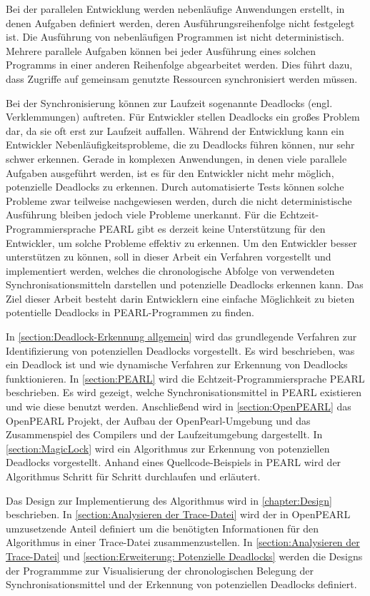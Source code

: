Bei der parallelen Entwicklung werden nebenläufige Anwendungen erstellt, in
denen Aufgaben definiert werden, deren Ausführungsreihenfolge nicht festgelegt
ist. Die Ausführung von nebenläufigen Programmen ist nicht deterministisch.
Mehrere parallele Aufgaben können bei jeder Ausführung eines solchen Programms
in einer anderen Reihenfolge abgearbeitet werden. Dies führt dazu, dass Zugriffe
auf gemeinsam genutzte Ressourcen synchronisiert werden müssen.

Bei der Synchronisierung können zur Laufzeit sogenannte Deadlocks (engl.
Verklemmungen) auftreten. Für Entwickler stellen Deadlocks ein großes Problem
dar, da sie oft erst zur Laufzeit auffallen. Während der Entwicklung kann ein
Entwickler Nebenläufigkeitsprobleme, die zu Deadlocks führen können, nur sehr
schwer erkennen. Gerade in komplexen Anwendungen, in denen viele parallele
Aufgaben ausgeführt werden, ist es für den Entwickler nicht mehr möglich,
potenzielle Deadlocks zu erkennen. Durch automatisierte Tests können solche
Probleme zwar teilweise nachgewiesen werden, durch die nicht deterministische
Ausführung bleiben jedoch viele Probleme unerkannt. Für die
Echtzeit-Programmiersprache PEARL gibt es derzeit keine Unterstützung für den
Entwickler, um solche Probleme effektiv zu erkennen. Um den Entwickler besser
unterstützen zu können, soll in dieser Arbeit ein Verfahren vorgestellt und
implementiert werden, welches die chronologische Abfolge von verwendeten
Synchronisationsmitteln darstellen und potenzielle Deadlocks erkennen kann. Das
Ziel dieser Arbeit besteht darin Entwicklern eine einfache Möglichkeit zu bieten
potentielle Deadlocks in PEARL-Programmen zu finden.

In \cref{section:Deadlock-Erkennung allgemein} wird das grundlegende Verfahren
zur Identifizierung von potenziellen Deadlocks vorgestellt. Es wird beschrieben,
was ein Deadlock ist und wie dynamische Verfahren zur Erkennung von Deadlocks
funktionieren. In \cref{section:PEARL} wird die Echtzeit-Programmiersprache
PEARL beschrieben. Es wird gezeigt, welche Synchronisationsmittel in PEARL
existieren und wie diese benutzt werden. Anschließend wird in
\cref{section:OpenPEARL} das OpenPEARL Projekt, der Aufbau der
OpenPearl-Umgebung und das Zusammenspiel des Compilers und der Laufzeitumgebung
dargestellt. In \cref{section:MagicLock} wird ein Algorithmus zur Erkennung von
potenziellen Deadlocks vorgestellt. Anhand eines Quellcode-Beispiels in PEARL
wird der Algorithmus Schritt für Schritt durchlaufen und erläutert. 

Das Design zur Implementierung des Algorithmus wird in \cref{chapter:Design}
beschrieben. In \cref{section:Analysieren der Trace-Datei} wird der in OpenPEARL
umzusetzende Anteil definiert um die benötigten Informationen für den
Algorithmus in einer Trace-Datei zusammenzustellen. In \cref{section:Analysieren
der Trace-Datei} und \cref{section:Erweiterung: Potenzielle Deadlocks} werden
die Designs der Programmme zur Visualisierung der chronologischen Belegung der
Synchronisationsmittel und der Erkennung von potenziellen Deadlocks definiert.

